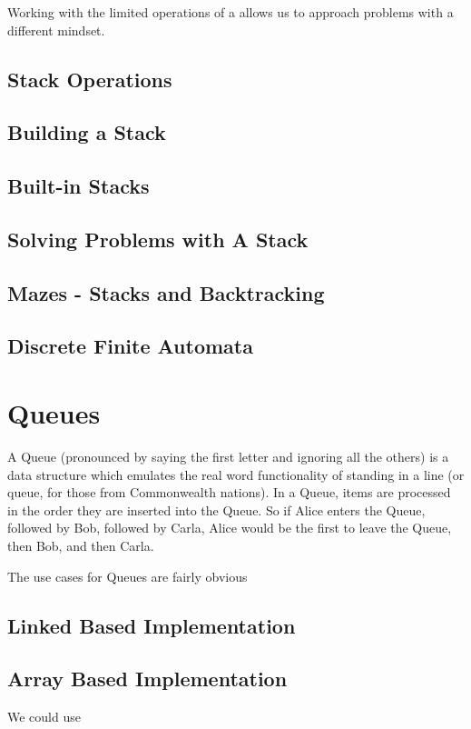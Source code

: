 \documentclass[10pt,a4paper]{book}
\begin{document}
Working with the limited operations of a allows us to approach problems with a different mindset.

\section{Stack Operations}


\section{Building a Stack}


\section{Built-in Stacks}

\section{Solving Problems with A Stack}


\section{Mazes - Stacks and Backtracking}



\section{Discrete Finite Automata}

\chapter{Queues}

A Queue (pronounced by saying the first letter and ignoring all the others) is a data structure which emulates the real word functionality of standing in a line (or queue, for those from Commonwealth nations).  
In a Queue, items are processed in the order they are inserted into the Queue.  So if Alice enters the Queue, followed by Bob, followed by Carla, Alice would be the first to leave the Queue, then Bob, and then Carla.

The use cases for Queues are fairly obvious

\section{Linked Based Implementation} 
\section{Array Based Implementation}
We could use 
\end{document}
